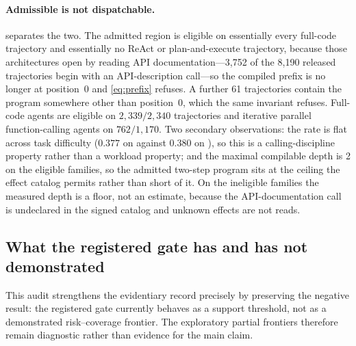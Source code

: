 \paragraph{Admissible is not dispatchable.}
 separates the two. The admitted region is eligible on
essentially every full-code trajectory and essentially no ReAct or
plan-and-execute trajectory, because those architectures open by reading API
documentation---3{,}752 of the 8{,}190 released trajectories begin with an
API-description call---so the compiled prefix is no longer at position~0 and
\eqref{eq:prefix} refuses. A further 61 trajectories contain the program somewhere
other than position~0, which the same invariant refuses. Full-code agents are eligible on $2{,}339/2{,}340$ trajectories and iterative
parallel function-calling agents on $762/1{,}170$. Two secondary observations: the
rate is flat across task difficulty ($0.377$ on  against
$0.380$ on ), so this is a calling-discipline property
rather than a workload property; and the maximal compilable depth is 2 on
the eligible families, so the admitted two-step program sits at the ceiling the
effect catalog permits rather than short of it. On the ineligible families the
measured depth is a floor, not an estimate, because the API-documentation call is
undeclared in the signed catalog and unknown effects are not reads.

\begin{table}[t]
  \centering
  \caption{Disposition of every retained external benchmark family. Only the
  four compiler-measurement rows support compiler claims; the remaining rows
  document why broader benchmark names are not silently converted into GAC
  results. BFCL appears twice because its reference plans and its executed gold
  plans are different evidence.}
  \label{tab:external-evidence-map}
  \footnotesize
  \setlength{\tabcolsep}{3pt}
  \renewcommand{\arraystretch}{1.05}
  
\end{table}

\subsection{What the registered gate has and has not demonstrated}

This audit strengthens the evidentiary record precisely by preserving the
negative result: the registered gate currently behaves as a support threshold,
not as a demonstrated risk--coverage frontier. The exploratory partial
frontiers therefore remain diagnostic rather than evidence for the main claim.

